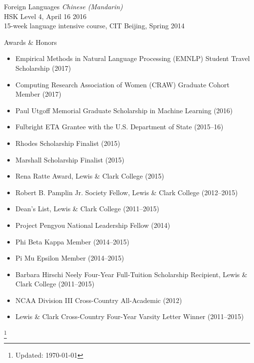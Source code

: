 \documentclass{resume} %
\newcommand\blfootnote[1]{%
  \begingroup
  \renewcommand\thefootnote{}\footnote{#1}%
  \addtocounter{footnote}{-1}%
  \endgroup
}
\begin{document}

\begin{rSection}{Foreign Languages}
\emph{Chinese (Mandarin)} \\
HSK Level 4, April 16 2016 \\
15-week language intensive course, CIT Beijing, Spring 2014
\end{rSection}


\begin{rSection}{Awards \& Honors}
\begin{itemize}
\item Empirical Methods in Natural Language Processing (EMNLP) Student Travel Scholarship (2017)
\item Computing Research Association of Women (CRAW) Graduate Cohort Member (2017) 
\item Paul Utgoff Memorial Graduate Scholarship in Machine Learning (2016) 
\item Fulbright ETA Grantee with the U.S. Department of State (2015--16)
\item Rhodes Scholarship Finalist (2015) 
\item Marshall Scholarship Finalist (2015) 
\item Rena Ratte Award, Lewis \& Clark College (2015) 
\item Robert B. Pamplin Jr. Society Fellow, Lewis \& Clark College (2012--2015)
\item Dean's List, Lewis \& Clark College (2011--2015)
\item Project Pengyou National Leadership Fellow (2014) 
\item Phi Beta Kappa Member (2014--2015)
\item Pi Mu Epsilon Member (2014--2015)
\item Barbara Hirschi Neely Four-Year Full-Tuition Scholarship Recipient, Lewis \& Clark College (2011--2015)
\item NCAA Division III Cross-Country All-Academic (2012) 
\item Lewis \& Clark Cross-Country Four-Year Varsity Letter Winner (2011--2015)
\end{itemize} 

\end{rSection}

\blfootnote{Updated: \today}

\bigskip
\end{document}
